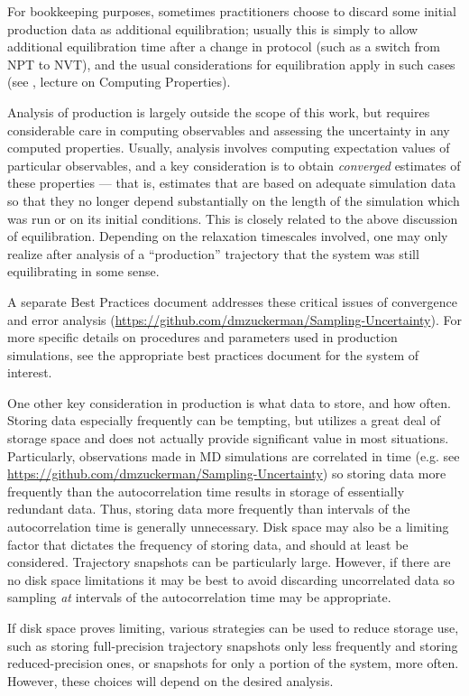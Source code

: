 \documentclass[9pt,bestpractices]{livecoms}
\begin{document}
For bookkeeping purposes, sometimes practitioners choose to discard some initial production data as additional equilibration; usually this is simply to allow additional equilibration time after a change in protocol (such as a switch from NPT to NVT), and the usual considerations for equilibration apply in such cases (see \citet{ShellNotes}, lecture on Computing Properties).

Analysis of production is largely outside the scope of this work, but requires considerable care in computing observables and assessing the uncertainty in any computed properties.
Usually, analysis involves computing expectation values of particular observables, and a key consideration is to obtain \emph{converged} estimates of these properties --- that is, estimates that are based on adequate simulation data so that they no longer depend substantially on the length of the simulation which was run or on its initial conditions.
This is closely related to the above discussion of equilibration.
Depending on the relaxation timescales involved, one may only realize after analysis of a ``production'' trajectory that the system was still equilibrating in some sense.

A separate Best Practices document addresses these critical issues of convergence and error analysis (\url{https://github.com/dmzuckerman/Sampling-Uncertainty}). 
For more specific details on procedures and parameters used in production simulations, see the appropriate best practices document for the system of interest.

One other key consideration in production is what data to store, and how often.
Storing data especially frequently can be tempting, but utilizes a great deal of storage space and does not actually provide significant value in most situations.
Particularly, observations made in MD simulations are correlated in time (e.g. see \url{https://github.com/dmzuckerman/Sampling-Uncertainty}) so storing data more frequently than the autocorrelation time results in storage of essentially redundant data.
Thus, storing data more frequently than intervals of the autocorrelation time is generally unnecessary.
Disk space may also be a limiting factor that dictates the frequency of storing data, and should at least be considered.
Trajectory snapshots can be particularly large.
However, if there are no disk space limitations it may be best to avoid discarding uncorrelated data so sampling \emph{at} intervals of the autocorrelation time may be appropriate.

If disk space proves limiting, various strategies can be used to reduce storage use, such as storing full-precision trajectory snapshots only less frequently and storing reduced-precision ones, or snapshots for only a portion of the system, more often.
However, these choices will depend on the desired analysis.
\end{document}
